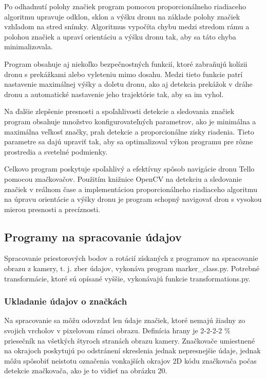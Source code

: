 Po odhadnutí polohy značiek program pomocou proporcionálneho riadiaceho algoritmu upravuje odklon, sklon a výšku dronu na základe polohy značiek vzhľadom na stred snímky. Algoritmus vypočíta chybu medzi stredom rámu a polohou značiek a upraví orientáciu a výšku dronu tak, aby sa táto chyba minimalizovala.

Program obsahuje aj niekoľko bezpečnostných funkcií, ktoré zabraňujú kolízii dronu s prekážkami alebo vyleteniu mimo dosahu. Medzi tieto funkcie patrí nastavenie maximálnej výšky a doletu dronu, ako aj detekcia prekážok v dráhe dronu a automatické nastavenie jeho trajektórie tak, aby sa im vyhol.

Na ďalšie zlepšenie presnosti a spoľahlivosti detekcie a sledovania značiek program obsahuje množstvo konfigurovateľných parametrov, ako je minimálna a maximálna veľkosť značky, prah detekcie a proporcionálne zisky riadenia. Tieto parametre sa dajú upraviť tak, aby sa optimalizoval výkon programu pre rôzne prostredia a svetelné podmienky.

Celkovo program poskytuje spoľahlivý a efektívny spôsob navigácie dronu Tello pomocou značkovačov. Použitím knižnice OpenCV na detekciu a sledovanie značiek v reálnom čase a implementáciou proporcionálneho riadiaceho algoritmu na úpravu orientácie a výšky dronu je program schopný navigovať dron s vysokou mierou presnosti a precíznosti.

\subsection{Programy na spracovanie údajov}
Spracovanie priestorových bodov a rotácií získaných z programov na spracovanie obrazu z kamery, t. j. zber údajov, vykonáva program marker\_class.py. Potrebné transformácie, ktoré sú opísané vyššie, vykonávajú funkcie transformations.py.
\subsubsection{Ukladanie údajov o značkách}
Na spracovanie sa môžu odovzdať len údaje značiek, ktoré nemajú žiadny zo svojich vrcholov v pixelovom rámci obrazu. Definícia hrany je 2-2-2-2 \% priesečník na všetkých štyroch stranách obrazu kamery. Značkovače umiestnené na okrajoch poskytujú po odstránení skreslenia jednak nepresnejšie údaje, jednak môžu spôsobiť neistotu označenia vonkajších okrajov 2D kódu značkovača počas detekcie značkovača, ako je to vidieť na obrázku 20.

